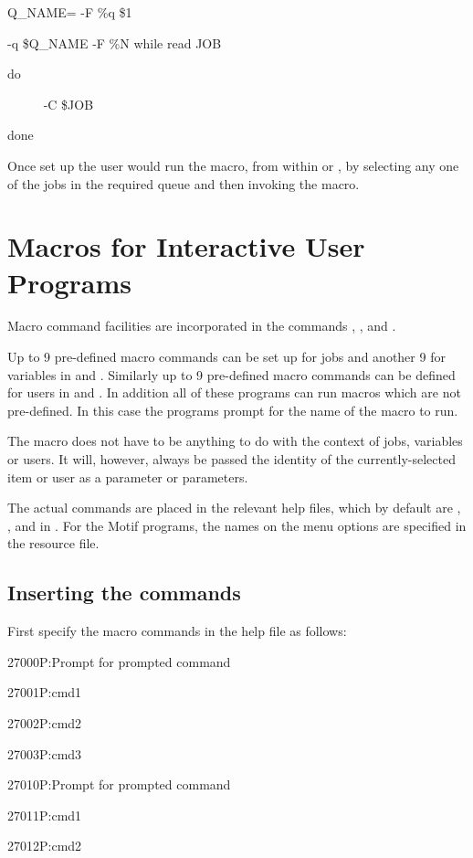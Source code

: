 \begin{exparasmall}

Q\_NAME={\textasciigrave}\BtjlistName{} -F {\textquotedbl}\%q{\textquotedbl} \$1{\textasciigrave}

\BtjlistName{} -q \$Q\_NAME -F {\textquotedbl}\%N{\textquotedbl} {\textbar} while read JOB

do

\ \ \ \ \ \BtjchangeName{} -C \$JOB

done

\end{exparasmall}

Once set up the user would run the macro, from within \PrBtq{} or \PrXmbtq{}, by selecting any one of the jobs in the required queue and then invoking
the macro.

\section{Macros for Interactive User Programs}
\label{bkm:Macrodefs}Macro command facilities are incorporated in the commands \PrBtq{}, \PrBtuser{}, \PrXmbtq{} and \PrXmbtuser{}.

Up to 9 pre-defined macro commands can be set up for jobs and another 9 for variables in \PrBtq{} and \PrXmbtq{}. Similarly up to 9 pre-defined macro
commands can be defined for users in \PrBtuser{} and \PrXmbtuser{}. In addition all of these programs can run macros which are not pre-defined. In this case the programs prompt for the name of the macro to run.

The macro does not have to be anything to do with the context of jobs, variables or users. It will, however, always be passed the identity of
the currently-selected item or user as a parameter or parameters.

The actual commands are placed in the relevant help files, which by default are ,
,  and  in . For the Motif programs, the names
on the menu options are specified in the resource file.

\subsection{Inserting the commands}
First specify the macro commands in the help file as follows:

\begin{expara}

27000P:Prompt for prompted command

27001P:cmd1

27002P:cmd2

27003P:cmd3

27010P:Prompt for prompted command

27011P:cmd1

27012P:cmd2

\end{expara}

